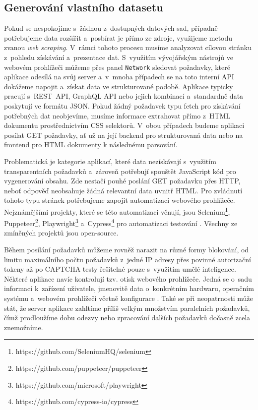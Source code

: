 \subsection{Generování vlastního datasetu}

Pokud se nespokojíme s~žádnou z~dostupných datových sad, případně potřebujeme data rozšířit a~posbírat je přímo ze zdroje, využijeme metodu zvanou \emph{web scraping}. V~rámci tohoto procesu musíme analyzovat cílovou stránku z~pohledu získávání a~prezentace dat. S~využitím vývojářským nástrojů ve webovém prohlížeči můžeme přes panel \texttt{Network} sledovat požadavky, které aplikace odesílá na svůj server a~v~mnoha případech se na toto interní API dokážeme napojit a~získat data ve strukturované podobě. Aplikace typicky pracují s~REST~API, GraphQL API nebo jejich kombinací a~standardně data poskytují ve formátu JSON. Pokud žádný požadavek typu fetch pro získávání potřebných dat neobjevíme, musíme informace extrahovat přímo z~HTML dokumentu prostřednictvím CSS selektorů. V~obou případech budeme aplikaci posílat GET požadavky, ať už na její backend pro strukturovaná data nebo na frontend pro HTML dokumenty k následnému parsování.

Problematická je kategorie aplikací, které data nezískávají s~využitím transparentních požadavků a~zároveň potřebují spouštět JavaScript kód pro vygenerování obsahu. Zde nestačí pouhé poslání GET požadavku přes HTTP, neboť odpověď neobsahuje žádná relevantní data uvnitř HTML. Pro zvládnutí tohoto typu stránek potřebujeme zapojit automatizaci webového prohlížeče. Nejznámějšími projekty, které se této automatizaci věnují, jsou Selenium\footnote{https://github.com/SeleniumHQ/selenium}, Puppeteer\footnote{https://github.com/puppeteer/puppeteer}, Playwright\footnote{https://github.com/microsoft/playwright} a~Cypress\footnote{https://github.com/cypress-io/cypress} pro automatizaci testování \citep{selenium-ecosystem}. Všechny ze zmíněných projektů jsou open-source.

Během posílání požadavků můžeme rovněž narazit na různé formy blokování, od limitu maximálního počtu požadavků z~jedné IP adresy přes povinné autorizační tokeny až po CAPTCHA testy řešitelné pouze s~využitím umělé inteligence. Některé aplikace navíc kontrolují tzv. otisk webového prohlížeče. Jedná se o~sadu informací k~zařízení uživatele, jmenovitě data o~konkrétním hardwaru, operačním systému a~webovém prohlížeči včetně konfigurace \citep{browser-fingerprints}. Také se při neopatrnosti může stát, že server aplikace zahltíme příliš velkým množstvím paralelních požadavků, čímž prodloužíme dobu odezvy nebo zpracování dalších požadavků dočasně zcela znemožníme.

